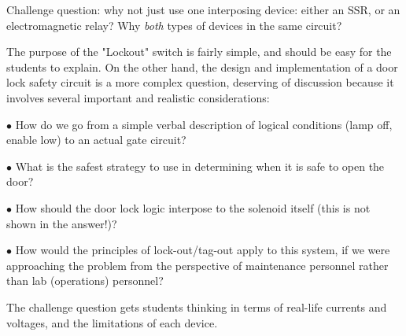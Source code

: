\vskip 10pt

Challenge question: why not just use one interposing device: either an SSR, or an electromagnetic relay?  Why {\it both} types of devices in the same circuit?







The purpose of the "Lockout" switch is fairly simple, and should be easy for the students to explain.  On the other hand, the design and implementation of a door lock safety circuit is a more complex question, deserving of discussion because it involves several important and realistic considerations:

\medskip
\item{$\bullet$} How do we go from a simple verbal description of logical conditions (lamp off, enable low) to an actual gate circuit?
\item{$\bullet$} What is the safest strategy to use in determining when it is safe to open the door?
\item{$\bullet$} How should the door lock logic interpose to the solenoid itself (this is not shown in the answer!)?
\item{$\bullet$} How would the principles of lock-out/tag-out apply to this system, if we were approaching the problem from the perspective of maintenance personnel rather than lab (operations) personnel?
\medskip

The challenge question gets students thinking in terms of real-life currents and voltages, and the limitations of each device.





